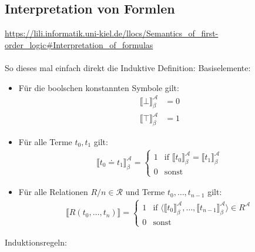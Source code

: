 \documentclass{article}
\begin{document}
    \subsection{Interpretation von Formlen}
    \url{https://lili.informatik.uni-kiel.de/llocs/Semantics_of_first-order_logic#Interpretation_of_formulas}\\\\
    So dieses mal einfach direkt die Induktive Definition:
    Basiselemente:
    \begin{itemize}
        \item Für die boolschen konstannten Symbole gilt: 
        \begin{align}
            \llbracket \bot \rrbracket_\beta^\mathcal A & = 0\\ 
            \llbracket \top \rrbracket_\beta^\mathcal A & = 1
        \end{align}
        \item Für alle Terme $t_0, t_1$ gilt: 
        \begin{align}
        \llbracket t_0 \doteq t_1 \rrbracket_\beta^\mathcal A = \begin{cases}1 & \text{if } \llbracket t_0 \rrbracket_\beta^\mathcal A = \llbracket t_1 \rrbracket_\beta^\mathcal A\\ 0 & \text{sonst}\end{cases} 
        \end{align}
        \item Für alle Relationen $R/n \in \mathcal R$ und Terme $t_0, \dots, t_{n-1}$ gilt:
        \begin{align}
        \llbracket R(t_0, \dots, t_n)\rrbracket = \begin{cases}1 & \text{if } \langle \llbracket t_0 \rrbracket_\beta^\mathcal A, \dots, \llbracket t_{n-1} \rrbracket_\beta^\mathcal A\rangle \in R^\mathcal A\\ 0 & \text{sonst}\end{cases} 
        \end{align}
    \end{itemize}
    Induktionsregeln:
\end{document}
